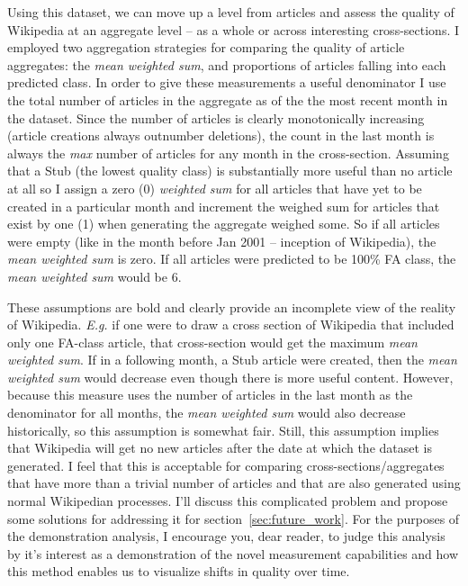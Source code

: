 

 Using this dataset, we can move up a level from articles and assess the quality of Wikipedia at an aggregate level -- as a whole or across interesting cross-sections.  I employed two aggregation strategies for comparing the quality of article aggregates: the \emph{mean weighted sum}, and proportions of articles falling into each predicted class.  In order to give these measurements a useful denominator I use the total number of articles in the aggregate as of the the most recent month in the dataset.  Since the number of articles is clearly monotonically increasing (article creations always outnumber deletions), the count in the last month is always the \emph{max} number of articles for any month in the cross-section.  Assuming that a Stub (the lowest quality class) is substantially more useful than no article at all so I assign a zero (0) \emph{weighted sum} for all articles that have yet to be created in a particular month and increment the weighed sum for articles that exist by one (1) when generating the aggregate weighed some.  So if all articles were empty (like in the month before Jan 2001 -- inception of Wikipedia), the \emph{mean weighted sum} is zero.  If all articles were predicted to be 100\% FA class, the \emph{mean weighted sum} would be 6.

These assumptions are bold and clearly provide an incomplete view of the reality of Wikipedia.  \emph{E.g.} if one were to draw a cross section of Wikipedia that included only one FA-class article, that cross-section would get the maximum \emph{mean weighted sum}.  If in a following month, a Stub article were created, then the \emph{mean weighted sum} would decrease even though there is more useful content.  However, because this measure uses the number of articles in the last month as the denominator for all months, the \emph{mean weighted sum} would also decrease historically, so this assumption is somewhat fair.  Still, this assumption implies that Wikipedia will get no new articles after the date at which the dataset is generated.  I feel that this is acceptable for comparing cross-sections/aggregates that have more than a trivial number of articles and that are also generated using normal Wikipedian processes.  I'll discuss this complicated problem and propose some solutions for addressing it for section~\ref{sec:future_work}.  For the purposes of the demonstration analysis, I encourage you, dear reader, to judge this analysis by it's interest as a demonstration of the novel measurement capabilities and how this method enables us to visualize shifts in quality over time.
